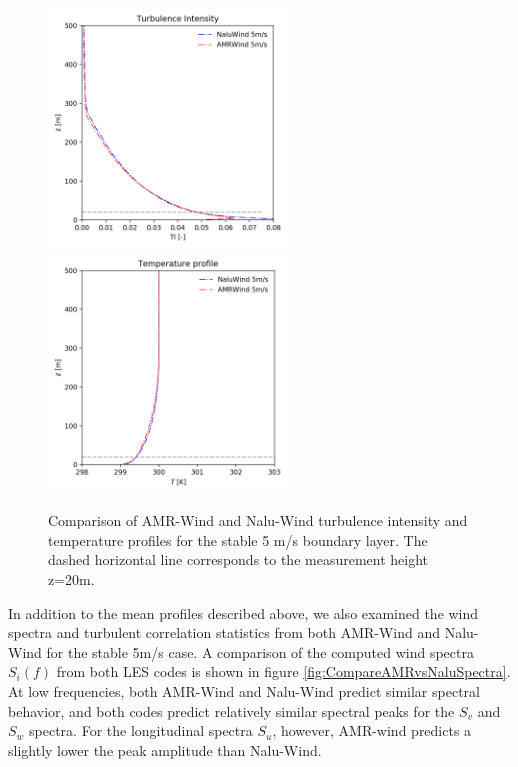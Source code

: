 \begin{figure} [hbt!]
  \centering
  \includegraphics[width=2.5in]{figures/Compare_AMRWind_NaluWind/AMRWind_NaluWind_stable_05ms_mesh2p5_2p5_2p5_TI.png}
  \includegraphics[width=2.5in]{figures/Compare_AMRWind_NaluWind/AMRWind_NaluWind_stable_05ms_mesh2p5_2p5_2p5_T.png}
  \caption{\label{fig:CompareAMRvsNaluWind_TTI} Comparison of AMR-Wind
    and Nalu-Wind turbulence intensity and temperature profiles for
    the stable 5 m/s boundary layer. The dashed horizontal line
    corresponds to the measurement height z=20m.}
\end{figure}

In addition to the mean profiles described above, we also examined the
wind spectra and turbulent correlation statistics from both AMR-Wind
and Nalu-Wind for the stable 5m/s case.  A comparison of the computed
wind spectra $S_i(f)$ from both LES codes is shown in figure
\ref{fig:CompareAMRvsNaluSpectra}.  At low frequencies, both AMR-Wind
and Nalu-Wind predict similar spectral behavior, and both codes
predict relatively similar spectral peaks for the $S_v$ and $S_w$
spectra.  For the longitudinal spectra $S_u$, however, AMR-wind
predicts a slightly lower the peak amplitude than Nalu-Wind.

